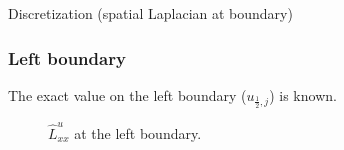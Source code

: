 \documentclass{beamer}
\begin{document}
	\begin{frame}{Discretization (spatial Laplacian at boundary)}
	
	\subsubsection{Left boundary}\label{subsubsec:laplacian-left}
	The exact value on the left boundary ($u_{\frac{1}{2},j}$) is known.
	\begin{figure}[H] %
	  \caption{$\hat{L}^u_{xx}$ at the left boundary.}\label{fig:luxx-left}
	\end{figure}
	\end{frame}
	
\end{document}
